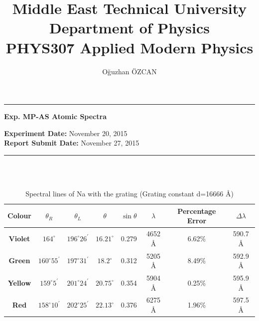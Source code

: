 \documentclass[a4paper,12pt]{article}
\title{Middle East Technical University\\Department of Physics\\\textbf{PHYS307 Applied Modern Physics}}
\author{Oğuzhan ÖZCAN}
\date{}
\providecommand{\expdate}[1]{\textbf{Experiment Date:} }
\providecommand{\repdate}[1]{\textbf{Report Submit Date:} }
\providecommand{\expname}[1]{\textbf{Exp. MP-AS Atomic Spectra} }
\begin{document}
\maketitle

\thispagestyle{fancy}

\noindent\rule{18.4cm}{0.8pt}
\begin{center}
	\expname{arg1}{}
\end{center}

\expdate{November 6, 2015}{November 20, 2015}\\
\repdate{arg1}{November 27, 2015}\\
\noindent\rule{18.4cm}{0.8pt}\\\\
\begin{table}[h!]

\begin{center}
\begin{tabular}{|c||c|c|c|c|c|c|c|}
	\hline \textbf{Colour}  & $\theta_{R}$ & $\theta_{L}$ &  $\theta$ & $\sin\theta$ & $\lambda$ & Percentage Error & $\Delta\lambda$ \\ 
	\hline \textbf{Violet}  & $164^{\circ}$ & $196^{\circ}26^{\prime}$ & $16.21^{\circ}$ & 0.279 & 4652 \AA & 6.62\% & 590.7 \AA \\ 
	\hline \textbf{Green}  & $160^{\circ}55^{\prime}$ & $197^{\circ}31^{\prime}$ & $18.2^{\circ}$ & 0.312 & 5205 \AA & 8.49\% & 592.9 \AA  \\ 
	\hline \textbf{Yellow} & $159^{\circ}5^{\prime}$ & $201^{\circ}24^{\prime}$ & $20.75^{\circ}$ & 0.354 & 5904 \AA & 0.25\% & 595.9 \AA \\ 
	\hline \textbf{Red} & $158^{\circ}10^{\prime}$ & $202^{\circ}25^{\prime}$ & $22.13^{\circ}$ & 0.376 & 6275 \AA & 1.96\% & 597.5 \AA \\ 
	\hline 
\end{tabular} 
\caption{Spectral lines of Na with the grating (Grating constant d=16666 \AA)}
\end{center}
\end{table}
\end{document}
